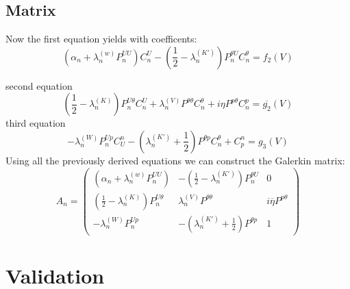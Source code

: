 \documentclass[10pt,journal,compsoc, onecolumn]{IEEEtran}
\begin{document}
\subsection{Matrix}

Now the first equation yields with coefficents: 
$$
(\alpha_n + \lambda_n^{(w)} P^{UU}_n) C^U_n - (\frac{1}{2} - \lambda_n^{(K')}) P_n^{\theta U} C^\theta_n = f_2(V)
$$

second equation
$$
(\frac{1}{2} - \lambda_n^{(K)})P^{U\theta}_n C^U_n + \lambda^{(V)}_n P^{\theta \theta} C^\theta_n  + i \eta P^{p \theta}C_n^p = \overline{g_2}(V)
$$
third equation 
$$
-\lambda_n^{(W)} P^{Up}_n C_U^n - (\lambda^{(K')}_n + \frac{1}{2})  P^{\theta p} C^\theta_n + C_p^n = g_3(V)
$$
Using all the previously derived equations we can construct the Galerkin matrix:
$$
A_n = 
\begin{pmatrix}
    (\alpha_n + \lambda_n^{(w)} P^{UU}_n)  & - (\frac{1}{2} - \lambda_n^{(K')}) P_n^{\theta U} & 0\\
    (\frac{1}{2} - \lambda_n^{(K)})P^{U\theta}_n  & \lambda^{(V)}_n P^{\theta \theta}  &  i \overline{\eta}     P^{p \theta} \\
    -\lambda_n^{(W)} P^{Up}_n  &  - (\lambda^{(K')}_n + \frac{1}{2})  P^{\theta p} & 1 
\end{pmatrix}
$$



\section{Validation}
\end{document}
